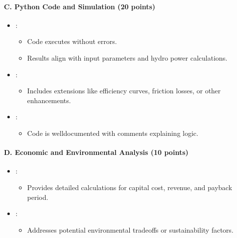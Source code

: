 \documentclass[letterpaper,10pt,english]{jupyterBook}
\begin{document}
\paragraph{C. Python Code and Simulation (20 points)}
\label{\detokenize{ProjectInstructions:id22}}\begin{itemize}
\item {} 
\sphinxAtStartPar
{}:
\begin{itemize}
\item {} 
\sphinxAtStartPar
Code executes without errors.

\item {} 
\sphinxAtStartPar
Results align with input parameters and hydro power
calculations.

\end{itemize}

\item {} 
\sphinxAtStartPar
{}:
\begin{itemize}
\item {} 
\sphinxAtStartPar
Includes extensions like efficiency curves, friction losses, or
other enhancements.

\end{itemize}

\item {} 
\sphinxAtStartPar
{}:
\begin{itemize}
\item {} 
\sphinxAtStartPar
Code is well\sphinxhyphen{}documented with comments explaining logic.

\end{itemize}

\end{itemize}


\paragraph{D. Economic and Environmental Analysis (10 points)}
\label{\detokenize{ProjectInstructions:id23}}\begin{itemize}
\item {} 
\sphinxAtStartPar
{}:
\begin{itemize}
\item {} 
\sphinxAtStartPar
Provides detailed calculations for capital cost, revenue, and
payback period.

\end{itemize}

\item {} 
\sphinxAtStartPar
{}:
\begin{itemize}
\item {} 
\sphinxAtStartPar
Addresses potential environmental trade\sphinxhyphen{}offs or sustainability
factors.

\end{itemize}

\end{itemize}
\end{document}
